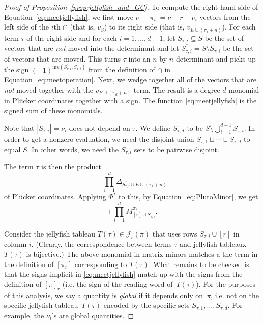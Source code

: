 \documentclass[ALCO, Unicode]{cedram}
\numberwithin{equation}{section}
\newcommand{\inv}{\mathrm{inv}}
\begin{document}
\begin{proof}[Proof of Proposition~\ref{prop:jellyfish_and_GC}]
To compute the right-hand side of Equation~\eqref{eq:meetjellyfish}, we first move $\nu - |\pi_i| = \nu - r - \nu_i$ vectors from the left side of the $i$th $\cap$ (that is, $v_S$) to its right side (that is, $v_{E \cup (\pi_i + n)}$). For each term $\tau$ of the right side and for each $i=1,\dots,d-1$, let $S_{\tau,i} \subseteq S$ be the set of vectors that are \emph{not} moved into the determinant and let $\overline{S_{\tau,i}} = S \setminus S_{\tau,i}$ be the set of vectors that are moved. This turns $\tau$ into an $n$ by $n$ determinant and picks up the sign $(-1)^{\inv(\overline{S_{\tau,i}}, S_{\tau,i})}$ from the definition of $\cap$ in Equation~\eqref{eq:meetoperation}.
Next, we wedge together all of the vectors that are {\sl not} moved together with the $v_{E \cup (\pi_d+n)}$ term. The result is a degree $d$ monomial in Pl\"ucker coordinates together with a sign. The function \eqref{eq:meetjellyfish} is the signed sum of these monomials. 

Note that $|S_{\tau,i}| = \nu_i$ does not depend on $\tau$. We define $S_{\tau,d}$ to be $S \setminus \bigcup_{i=1}^{d-1}S_{\tau,i}$. In order to get a nonzero evaluation, we need the disjoint union $S_{\tau,1} \sqcup \cdots \sqcup S_{\tau, d}$ to  equal  $S$. In other words, we need the $S_{\tau,i}$ sets to be pairwise disjoint.

The term $\tau$ is then the product 
\begin{equation}
\pm \prod_{i=1}^d\Delta_{\overline{S_{\tau,i}} \cup E \cup (\pi_i+n)}
\end{equation}
of Pl\"ucker coordinates.
Applying $\Phi^*$ to this, by Equation~\eqref{eq:PlutoMinor}, we get 
\begin{equation}
\pm \prod_{i=1}^d M^{\pi_i}_{[r] \cup S_{\tau,i}}.
\end{equation}

Consider the jellyfish tableau $T(\tau) \in \mathcal{J}_r(\pi)$ that uses rows $S_{\tau,i} \cup [r]$ in column $i$. (Clearly, the correspondence between terms $\tau$ and jellyfish tableaux $T(\tau)$ is bijective.) The above monomial in matrix minors matches a the term in the definition of $[\pi_r]$ corresponding to $T(\tau)$. What remains to be checked is that the signs implicit in \eqref{eq:meetjellyfish} match up with the signs from the definition of $[\pi]_r$ (i.e. the sign of the reading word of~$T(\tau)$). For the purposes of this analysis, we say a quantity is \emph{global} if it depends only on~$\pi$, i.e. not on the specific jellyfish tableau~$T(\tau)$ encoded by the specific sets $S_{\tau,1},\dots,S_{\tau,d}$. For example, the $\nu_i$'s are global quantities. 


\end{proof}
\end{document}
